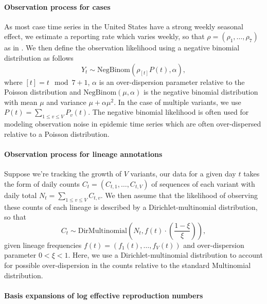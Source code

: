 \documentclass[11pt,oneside,letterpaper]{article}
\begin{document}
\paragraph{Observation process for cases}%

As most case time series in the United States have a strong weekly seasonal effect, we estimate a reporting rate which varies weekly, so that $\rho = (\rho_{1}, \ldots, \rho_{7})$ as in \cite{Abbott2020}.
We then define the observation likelihood using a negative binomial distribution as follows
\begin{equation}
  Y_{t} \sim \text{NegBinom}(\rho_{[t]} P(t),  \alpha),
\end{equation}
where $[t] = t \mod 7 + 1$, $\alpha$ is an over-dispersion parameter relative to the Poisson distribution and $\text{NegBinom}(\mu, \alpha)$ is the negative binomial distribution with mean $\mu$ and variance  $\mu + \alpha\mu^{2}$. In the case of multiple variants, we use $P(t) = \sum_{1\leq v \leq V} P_{v}(t)$.
The negative binomial likelihood is often used for modeling observation noise in epidemic time series which are often over-dispersed relative to a Poisson distribution. %

\paragraph{Observation process for lineage annotations}%

Suppose we're tracking the growth of $V$ variants, our data for a given day $t$ takes the form of daily counts $C_{t} = (C_{t,1}, \ldots, C_{t,V})$ of sequences of each variant with daily total $N_{t} = \sum_{1\leq v \leq V} C_{t, v}$.
We then assume that the likelihood of observing these counts of each lineage is described by a Dirichlet-multinomial distribution, so that
\begin{equation}
    C_{t} \sim \text{DirMultinomial}\left(N_{t}, f(t)\cdot \left(\frac{1-\xi}{\xi}\right)\right),
\end{equation}
given lineage frequencies $f(t) = (f_{1}(t), \ldots, f_{V}(t))$ and over-dispersion parameter $0<\xi<1$.
Here, we use a Dirichlet-multinomial distribution to account for possible over-dispersion in the counts relative to the standard Multinomial distribution.

\paragraph{Basis expansions of log effective reproduction numbers}%
\end{document}
